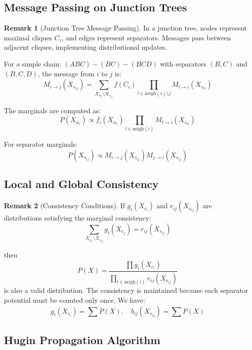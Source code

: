 \documentclass[12pt,a4paper]{article}
\theoremstyle{definition}
\newtheorem{remark}{Remark}[section]
\begin{document}
\subsection{Message Passing on Junction Trees}

\begin{remark}[Junction Tree Message Passing]
In a junction tree, nodes represent maximal cliques $C_i$, and edges represent separators. Messages pass between adjacent cliques, implementing distributional updates.

For a simple chain: $(ABC) - (BC) - (BCD)$ with separators $(B,C)$ and $(B,C,D)$, the message from $i$ to $j$ is:
\[
M_{i \to j}(X_{s_{ij}}) = \sum_{X_{\alpha_i} \setminus X_{s_{ij}}} f(C_i) \prod_{l \in \text{neigh}(i) \setminus j} M_{l \to i}(X_{s_{il}})
\]

The marginals are computed as:
\[
P(X_{\alpha_i}) \propto f_i(X_{\alpha_i}) \prod_{l \in \text{neigh}(i)} M_{l \to i}(X_{s_{il}})
\]

For separator marginals:
\[
P(X_{s_{ij}}) \propto M_{i \to j}(X_{s_{ij}}) M_{j \to i}(X_{s_{ij}})
\]
\end{remark}

\subsection{Local and Global Consistency}

\begin{remark}[Consistency Conditions]
If $g_i(X_{c_i})$ and $r_{ij}(X_{s_{ij}})$ are distributions satisfying the marginal consistency:
\[
\sum_{X_{\alpha_i} \setminus X_{s_{ij}}} g_i(X_{c_j}) = r_{ij}(X_{s_{ij}})
\]

then
\[
P(X) = \frac{\prod g_i(X_{c_i})}{\prod_{l \in \text{neigh}(i)} r_{ij}(X_{s_{ij}})}
\]
is also a valid distribution. The consistency is maintained because each separator potential must be counted only once. We have:
\[
g_i(X_{c_i}) = \sum P(X), \quad b_{ij}(X_{s_{ij}}) = \sum P(X)
\]
\end{remark}

\subsection{Hugin Propagation Algorithm}
\end{document}
